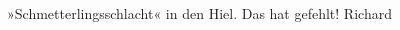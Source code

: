 \begin{ledgroupsized}[t]{13cm}
                  »Schmetterlingsschlacht« in den Hi{\geminationm}el. Das hat \label{T_L00394_1v}\label{T_L00394_1h} gefehlt!
                  \spacefill\mbox{Richard}\pend
                     \endnumbering{}\end{ledgroupsized}  \newcommand{\dateiname}{L00394}\newcommand{\titel}{Richard Beer-Hofmann an Arthur Schnitzler, 28. 10. 1894}\newcommand{\editorInnen}{Martin Anton Müller und Gerd-Hermann Susen}
            \footnotesize
\begin{ledgroupsized}[t]{11.5cm}
\end{ledgroupsized}
         
      
